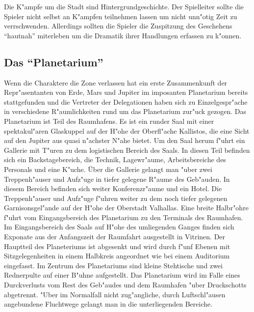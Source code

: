 \begin{remarks}
	Die K"ampfe um die Stadt sind Hintergrundgeschichte. Der Spielleiter sollte die Spieler nicht selbst an K"ampfen teilnehmen lassen um nicht unn"otig Zeit zu verrschwenden. Allerdings sollten die Spieler die Zuspitzung des Geschehens "`hautnah"' miterleben um die Dramatik ihrer Handlungen erfassen zu k"onnen.
\end{remarks}


\subsection{Das "`Planetarium"'} 
Wenn die Charaktere die Zone verlassen hat ein erste Zusammenkunft der Repr"asentanten von Erde, Mars und Jupiter im imposanten Planetarium bereits stattgefunden und die Vertreter der Delegationen haben sich zu Einzelgespr"ache in verschiedene R"aumlichkeiten rund um das Planetarium zur"uck gezogen. Das Planetarium ist Teil des Raumhafens. Es ist ein runder Saal mit einer spektakul"aren Glaskuppel auf der H"ohe der Oberfl"ache Kallistos, die eine Sicht auf den Jupiter aus quasi n"achster N"ahe bietet. Um den Saal herum f"uhrt ein Gallerie mit T"uren zu dem logistischen Bereich des Saals. In diesen Teil befinden sich ein Backstagebereich, die Technik, Lagewr"aume, Arbeitsbereiche des Personals und eine K"uche. Über die Gallerie gelangt man "uber zwei Treppenh"auser und Aufz"uge in tiefer gelegene R"aume des Geb"auden. In diesem Bereich befinden sich weiter Konferenzr"aume und ein Hotel. Die Treppenh"auser und Aufz"uge f"uhren weiter zu dem noch tiefer gelegenen Garnisonsgel"ande auf der H"ohe der Oberstadt Valhallas. Eine breite Halbr"ohre f"uhrt vom Eingangsbereich des Planetarium zu den Terminals des Raumhafen. Im Eingangsbereich des Saals auf H"ohe des umliegenden Ganges finden sich Exponate aus der Anfangszeit der Raumfahrt ausgestellt in Vitrinen. Der Hauptteil des Planeteriums ist abgesenkt und wird durch f"unf Ebenen mit Sitzgelegenheiten in einem Halbkreis angeordnet wie bei einem Auditorium eingefasst. Im Zentrum des Planetariums sind kleine Stehtische und zwei Rednerpulte auf einer B"uhne aufgestellt. Das Planetarium wird im Falle eines Durckverlusts vom Rest des Geb"audes und dem Raumhafen "uber Druckschotts abgetrennt. "Uber im Normalfall nicht zug"angliche, durch Luftschl"ausen angebundene Fluchtwege gelangt man in die unterliegenden Bereiche.

